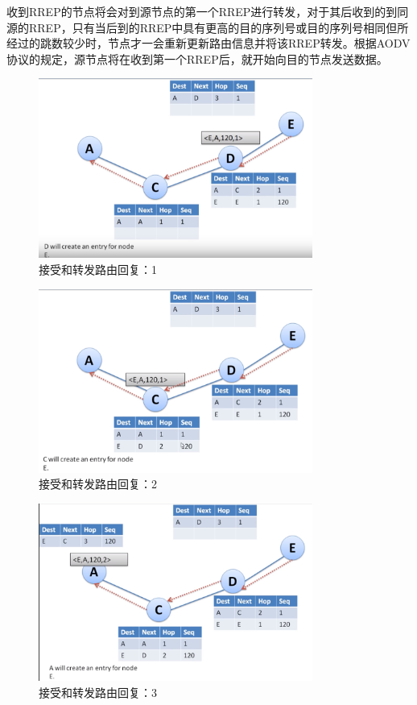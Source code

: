 \documentclass[12pt,a4paper]{article}
\begin{document}
收到RREP的节点将会对到源节点的第一个RREP进行转发，对于其后收到的到同源的RREP，只有当后到的RREP中具有更高的目的序列号或目的序列号相同但所经过的跳数较少时，节点才一会重新更新路由信息并将该RREP转发。根据AODV协议的规定，源节点将在收到第一个RREP后，就开始向目的节点发送数据。

\begin{figure}[htb]
\centering
\includegraphics[width=9cm]{receive_route_reply_1}
\caption{接受和转发路由回复：1}
\end{figure}

\begin{figure}[htb]
\centering
\includegraphics[width=9cm]{receive_route_reply_2}
\caption{接受和转发路由回复：2}
\end{figure}

\begin{figure}[htb]
\centering
\includegraphics[width=9cm]{receive_route_reply_3}
\caption{接受和转发路由回复：3}
\end{figure}
\end{document}
